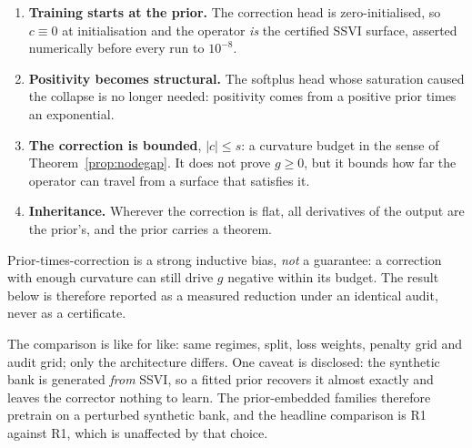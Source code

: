 \begin{enumerate}[label=(\roman*)]
\item \textbf{Training starts at the prior.} The correction head is zero-initialised, so
$c\equiv0$ at initialisation and the operator \emph{is} the certified SSVI surface, asserted
numerically before every run to $10^{-8}$.
\item \textbf{Positivity becomes structural.} The softplus head whose saturation caused the
collapse is no longer needed: positivity comes from a positive prior times an exponential.
\item \textbf{The correction is bounded}, $|c|\le s$: a curvature budget in the sense of
Theorem~\ref{prop:nodegap}. It does not prove $g\ge0$, but it bounds how far the operator can
travel from a surface that satisfies it.
\item \textbf{Inheritance.} Wherever the correction is flat, all derivatives of the output are
the prior's, and the prior carries a theorem.
\end{enumerate}

Prior-times-correction is a strong inductive bias, \emph{not} a guarantee: a correction with
enough curvature can still drive $g$ negative within its budget. The result below is therefore
reported as a measured reduction under an identical audit, never as a certificate.

The comparison is like for like: same regimes, split, loss weights, penalty grid and audit
grid; only the architecture differs. One caveat is disclosed: the synthetic bank is generated
\emph{from} SSVI, so a fitted prior recovers it almost exactly and leaves the corrector nothing
to learn. The prior-embedded families therefore pretrain on a perturbed synthetic bank, and the
headline comparison is R1 against R1, which is unaffected by that choice.


